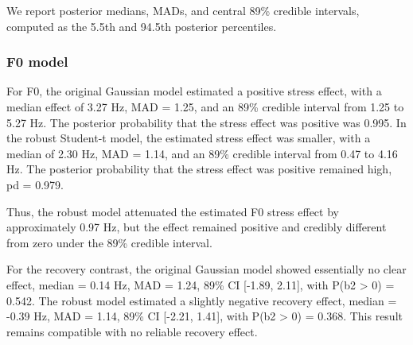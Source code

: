 \documentclass[
  english,
  man,floatsintext]{apa6}
\begin{document}
We report posterior medians, MADs, and central 89\% credible intervals, computed as the 5.5th and 94.5th posterior percentiles.

\subsubsection{F0 model}\label{f0-model}

For F0, the original Gaussian model estimated a positive stress effect, with a median effect of 3.27 Hz, MAD = 1.25, and an 89\% credible interval from 1.25 to 5.27 Hz. The posterior probability that the stress effect was positive was 0.995. In the robust Student-t model, the estimated stress effect was smaller, with a median of 2.30 Hz, MAD = 1.14, and an 89\% credible interval from 0.47 to 4.16 Hz. The posterior probability that the stress effect was positive remained high, pd = 0.979.

Thus, the robust model attenuated the estimated F0 stress effect by approximately 0.97 Hz, but the effect remained positive and credibly different from zero under the 89\% credible interval.

For the recovery contrast, the original Gaussian model showed essentially no clear effect, median = 0.14 Hz, MAD = 1.24, 89\% CI {[}-1.89, 2.11{]}, with P(b2 \textgreater{} 0) = 0.542. The robust model estimated a slightly negative recovery effect, median = -0.39 Hz, MAD = 1.14, 89\% CI {[}-2.21, 1.41{]}, with P(b2 \textgreater{} 0) = 0.368. This result remains compatible with no reliable recovery effect.
\end{document}
